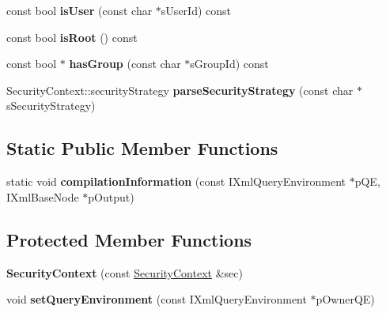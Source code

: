 \begin{DoxyCompactItemize}
\item 
\hypertarget{classgeneral__server_1_1SecurityContext_a977935f32d57804a68723445bcb40cd9}{const bool {\bfseries is\-User} (const char $\ast$s\-User\-Id) const }\label{classgeneral__server_1_1SecurityContext_a977935f32d57804a68723445bcb40cd9}

\item 
\hypertarget{classgeneral__server_1_1SecurityContext_a2fbddf57d77e0c1f4b88f1f28bedd7e5}{const bool {\bfseries is\-Root} () const }\label{classgeneral__server_1_1SecurityContext_a2fbddf57d77e0c1f4b88f1f28bedd7e5}

\item 
\hypertarget{classgeneral__server_1_1SecurityContext_ab9dccaca932529f26807d036eb0f00a6}{const bool $\ast$ {\bfseries has\-Group} (const char $\ast$s\-Group\-Id) const }\label{classgeneral__server_1_1SecurityContext_ab9dccaca932529f26807d036eb0f00a6}

\item 
\hypertarget{classgeneral__server_1_1SecurityContext_a8f0773151cbab82b828a0effabccccb9}{\-Security\-Context\-::security\-Strategy {\bfseries parse\-Security\-Strategy} (const char $\ast$s\-Security\-Strategy)}\label{classgeneral__server_1_1SecurityContext_a8f0773151cbab82b828a0effabccccb9}

\end{DoxyCompactItemize}
\subsection*{\-Static \-Public \-Member \-Functions}
\begin{DoxyCompactItemize}
\item 
\hypertarget{classgeneral__server_1_1SecurityContext_a5d34a380ace7f61716d358b5b7453b41}{static void {\bfseries compilation\-Information} (const \-I\-Xml\-Query\-Environment $\ast$p\-Q\-E, \-I\-Xml\-Base\-Node $\ast$p\-Output)}\label{classgeneral__server_1_1SecurityContext_a5d34a380ace7f61716d358b5b7453b41}

\end{DoxyCompactItemize}
\subsection*{\-Protected \-Member \-Functions}
\begin{DoxyCompactItemize}
\item 
\hypertarget{classgeneral__server_1_1SecurityContext_af0f192cc8828c45788e3f0f7a419eb6b}{{\bfseries \-Security\-Context} (const \hyperlink{classgeneral__server_1_1SecurityContext}{\-Security\-Context} \&sec)}\label{classgeneral__server_1_1SecurityContext_af0f192cc8828c45788e3f0f7a419eb6b}

\item 
\hypertarget{classgeneral__server_1_1SecurityContext_a71c54159cc4f66252c7453b4f199fbcd}{void {\bfseries set\-Query\-Environment} (const \-I\-Xml\-Query\-Environment $\ast$p\-Owner\-Q\-E)}\label{classgeneral__server_1_1SecurityContext_a71c54159cc4f66252c7453b4f199fbcd}

\end{DoxyCompactItemize}
